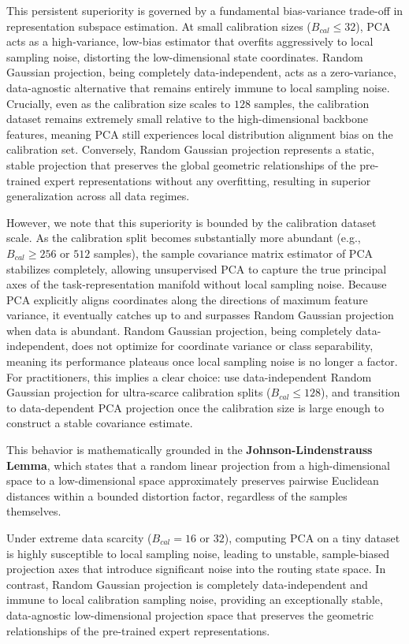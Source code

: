 This persistent superiority is governed by a fundamental bias-variance trade-off in representation
subspace estimation. At small calibration sizes ($B_{cal} \le 32$), PCA acts as a high-variance,
low-bias estimator that overfits aggressively to local sampling noise, distorting the
low-dimensional state coordinates. Random Gaussian projection, being completely data-independent,
acts as a zero-variance, data-agnostic alternative that remains entirely immune to local sampling
noise. Crucially, even as the calibration size scales to $128$ samples, the calibration dataset
remains extremely small relative to the high-dimensional backbone features, meaning PCA still
experiences local distribution alignment bias on the calibration set. Conversely, Random Gaussian
projection represents a static, stable projection that preserves the global geometric relationships
of the pre-trained expert representations without any overfitting, resulting in superior
generalization across all data regimes.

However, we note that this superiority is bounded by the calibration dataset scale. As the
calibration split becomes substantially more abundant (e.g., $B_{cal} \ge 256$ or $512$ samples),
the sample covariance matrix estimator of PCA stabilizes completely, allowing unsupervised PCA to
capture the true principal axes of the task-representation manifold without local sampling noise.
Because PCA explicitly aligns coordinates along the directions of maximum feature variance, it
eventually catches up to and surpasses Random Gaussian projection when data is abundant. Random
Gaussian projection, being completely data-independent, does not optimize for coordinate variance or
class separability, meaning its performance plateaus once local sampling noise is no longer a
factor. For practitioners, this implies a clear choice: use data-independent Random Gaussian
projection for ultra-scarce calibration splits ($B_{cal} \le 128$), and transition to data-dependent
PCA projection once the calibration size is large enough to construct a stable covariance estimate.

This behavior is mathematically grounded in the \textbf{Johnson-Lindenstrauss Lemma}, which states
that a random linear projection from a high-dimensional space to a low-dimensional space
approximately preserves pairwise Euclidean distances within a bounded distortion factor, regardless
of the samples themselves. 

Under extreme data scarcity ($B_{cal}=16$ or $32$), computing PCA on a tiny dataset is highly
susceptible to local sampling noise, leading to unstable, sample-biased projection axes that
introduce significant noise into the routing state space. In contrast, Random Gaussian projection is
completely data-independent and immune to local calibration sampling noise, providing an
exceptionally stable, data-agnostic low-dimensional projection space that preserves the geometric
relationships of the pre-trained expert representations.

